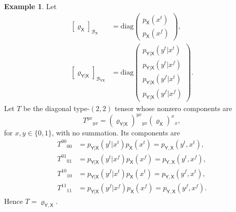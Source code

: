 \documentclass[
    aps,
    pra,
    reprint,
    superscriptaddress,
    nofootinbib
]{revtex4-2}
\theoremstyle{definition}
\newtheorem{example}{Example}[section]
\theoremstyle{plain}
\begin{document}
\begin{example}
    Let
    \begin{equation}
        \begin{aligned}
        [\varrho_{\mathsf{X}}]_{\mathcal{B}_{\mathsf{X}}}
        &=
        \mathrm{diag}
        \begin{pmatrix}
            p_{\mathsf{X}}(x^{t})\\
            p_{\mathsf{X}}(x^{f})
        \end{pmatrix},\\
        [\varrho_{\mathsf{Y}|\mathsf{X}}]
        _{\mathcal{B}_{\mathsf{Y}\mathsf{X}}}
        &=
        \mathrm{diag}
        \begin{pmatrix}
            p_{\mathsf{Y}|\mathsf{X}}(y^{t}|x^{t})\\
            p_{\mathsf{Y}|\mathsf{X}}(y^{t}|x^{f})\\
            p_{\mathsf{Y}|\mathsf{X}}(y^{f}|x^{t})\\
            p_{\mathsf{Y}|\mathsf{X}}(y^{f}|x^{f})
        \end{pmatrix}.
        \end{aligned}
    \end{equation}
    Let $T$ be the diagonal type-$(2,2)$ tensor whose nonzero
    components are
    \begin{equation}
        T^{yx}{}_{yx}
        =
        (\varrho_{\mathsf{Y}|\mathsf{X}})
        ^{yx}{}_{yx}
        (\varrho_{\mathsf{X}})^{x}{}_{x},
    \end{equation}
    for $x,y\in\{0,1\}$, with no summation. Its components are
    \begin{align}
        T^{00}{}_{00}
        &=
        p_{\mathsf{Y}|\mathsf{X}}(y^{t}|x^{t})
        p_{\mathsf{X}}(x^{t})
        =
        p_{\mathsf{Y},\mathsf{X}}(y^{t},x^{t}),\\
        T^{01}{}_{01}
        &=
        p_{\mathsf{Y}|\mathsf{X}}(y^{t}|x^{f})
        p_{\mathsf{X}}(x^{f})
        =
        p_{\mathsf{Y},\mathsf{X}}(y^{t},x^{f}),\\
        T^{10}{}_{10}
        &=
        p_{\mathsf{Y}|\mathsf{X}}(y^{f}|x^{t})
        p_{\mathsf{X}}(x^{t})
        =
        p_{\mathsf{Y},\mathsf{X}}(y^{f},x^{t}),\\
        T^{11}{}_{11}
        &=
        p_{\mathsf{Y}|\mathsf{X}}(y^{f}|x^{f})
        p_{\mathsf{X}}(x^{f})
        =
        p_{\mathsf{Y},\mathsf{X}}(y^{f},x^{f}).
    \end{align}
    Hence $T=\varrho_{\mathsf{Y},\mathsf{X}}$.
\end{example}
\end{document}
